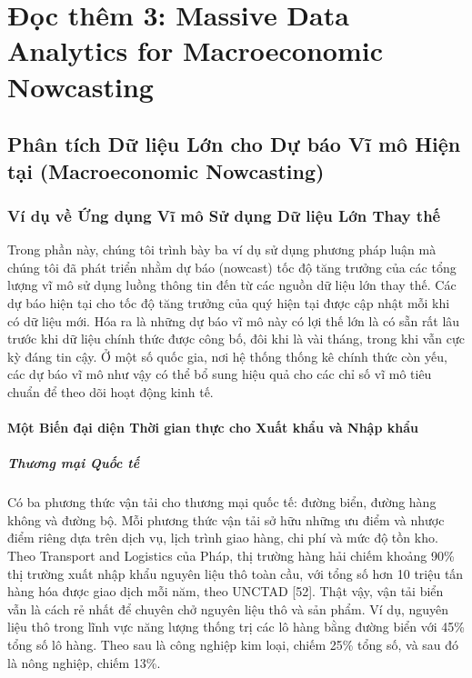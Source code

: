 \chapter{Đọc thêm 3: Massive Data Analytics for Macroeconomic Nowcasting}
\label{ch:M1L1-reading3}

\section{Phân tích Dữ liệu Lớn cho Dự báo Vĩ mô Hiện tại (Macroeconomic Nowcasting)}

\subsection{Ví dụ về Ứng dụng Vĩ mô Sử dụng Dữ liệu Lớn Thay thế}

Trong phần này, chúng tôi trình bày ba ví dụ sử dụng phương pháp luận mà chúng tôi đã phát triển nhằm dự báo (nowcast) tốc độ tăng trưởng của các tổng lượng vĩ mô sử dụng luồng thông tin đến từ các nguồn dữ liệu lớn thay thế. Các dự báo hiện tại cho tốc độ tăng trưởng của quý hiện tại được cập nhật mỗi khi có dữ liệu mới. Hóa ra là những dự báo vĩ mô này có lợi thế lớn là có sẵn rất lâu trước khi dữ liệu chính thức được công bố, đôi khi là vài tháng, trong khi vẫn cực kỳ đáng tin cậy. Ở một số quốc gia, nơi hệ thống thống kê chính thức còn yếu, các dự báo vĩ mô như vậy có thể bổ sung hiệu quả cho các chỉ số vĩ mô tiêu chuẩn để theo dõi hoạt động kinh tế.

\subsubsection{Một Biến đại diện Thời gian thực cho Xuất khẩu và Nhập khẩu}

\paragraph{Thương mại Quốc tế}
Có ba phương thức vận tải cho thương mại quốc tế: đường biển, đường hàng không và đường bộ. Mỗi phương thức vận tải sở hữu những ưu điểm và nhược điểm riêng dựa trên dịch vụ, lịch trình giao hàng, chi phí và mức độ tồn kho. Theo Transport and Logistics của Pháp, thị trường hàng hải chiếm khoảng 90\% thị trường xuất nhập khẩu nguyên liệu thô toàn cầu, với tổng số hơn 10 triệu tấn hàng hóa được giao dịch mỗi năm, theo UNCTAD [52]. Thật vậy, vận tải biển vẫn là cách rẻ nhất để chuyên chở nguyên liệu thô và sản phẩm. Ví dụ, nguyên liệu thô trong lĩnh vực năng lượng thống trị các lô hàng bằng đường biển với 45\% tổng số lô hàng. Theo sau là công nghiệp kim loại, chiếm 25\% tổng số, và sau đó là nông nghiệp, chiếm 13\%.

